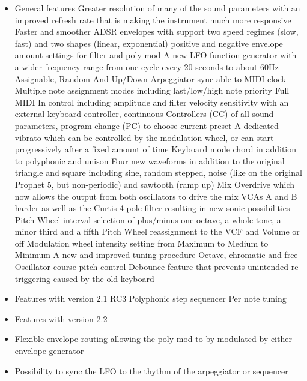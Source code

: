 \documentclass[draft,landscape, 11pt, oneside]{report}
\newenvironment{flowtext}{\addmargin[0cm]{7cm}}{\endaddmargin} %
\begin{document}
\begin{flowtext}
\begin{itemize}
  \setlength\itemsep{0cm}
  \item{General features}
  \subitem Greater resolution of many of the sound parameters with an improved refresh rate that is making the instrument much more responsive
  \subitem Faster and smoother ADSR envelopes with support two speed regimes (slow, fast) and two shapes (linear, exponential)
  \subitem positive and negative envelope amount settings for filter and poly-mod
  \subitem A new LFO function generator with a wider frequency range from one cycle every 20 seconds to about 60Hz
  \subitem Assignable, Random And Up/Down Arpeggiator sync-able to MIDI clock
  \subitem Multiple note assignment modes including last/low/high note priority
  \subitem Full MIDI In control including amplitude and filter velocity sensitivity with an external keyboard controller, continuous Controllers (CC) of all sound parameters, program change (PC) to choose current preset
  \subitem A dedicated vibrato which can be controlled by the modulation wheel, or can start progressively after a fixed amount of time
  \subitem Keyboard mode chord in addition to polyphonic and unison  
  \subitem Four new waveforms in addition to the original triangle and square including sine, random stepped, noise (like on the original Prophet 5, but non-periodic) and sawtooth (ramp up)
  \subitem Mix Overdrive which now allows the output from both oscillators to drive the mix VCAs A and B harder as well as the Curtis 4 pole filter resulting in new sonic possibilities
  \subitem Pitch Wheel interval selection of plus/minus one octave, a whole tone, a minor third and a fifth
  \subitem Pitch Wheel reassignment to the VCF and Volume or off   
  \subitem Modulation wheel intensity setting from Maximum to Medium to Minimum
  \subitem A new and improved tuning procedure
  \subitem Octave, chromatic and free Oscillator course pitch control
  \subitem Debounce feature that prevents unintended re-triggering caused by the old keyboard
  \item Features with version 2.1 RC3
  \subitem Polyphonic step sequencer
  \subitem Per note tuning
  \item Features with version 2.2
  \item Flexible envelope routing allowing the poly-mod to by modulated by either envelope generator
  \item Possibility to sync the LFO to the thythm of the arpeggiator or sequencer
\end{itemize}


\end{flowtext}
\end{document}
